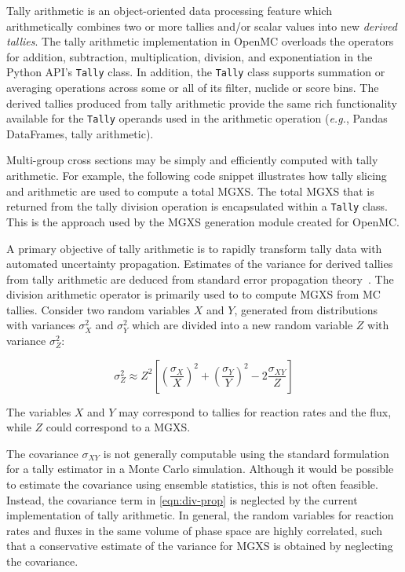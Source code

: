 Tally arithmetic is an object-oriented data processing feature which arithmetically combines two or more tallies and/or scalar values into new \textit{derived tallies}. The tally arithmetic implementation in OpenMC overloads the operators for addition, subtraction, multiplication, division, and exponentiation in the Python API's \texttt{Tally} class. In addition, the \texttt{Tally} class supports summation or averaging operations across some or all of its filter, nuclide or score bins. The derived tallies produced from tally arithmetic provide the same rich functionality available for the \texttt{Tally} operands used in the arithmetic operation (\textit{e.g.}, Pandas DataFrames, tally arithmetic).

Multi-group cross sections may be simply and efficiently computed with tally arithmetic. For example, the following code snippet illustrates how tally slicing and arithmetic are used to compute a total MGXS. The total MGXS that is returned from the tally division operation is encapsulated within a \texttt{Tally} class. This is the approach used by the MGXS generation module created for OpenMC.



A primary objective of tally arithmetic is to rapidly transform tally data with automated uncertainty propagation. Estimates of the variance for derived tallies from tally arithmetic are deduced from standard error propagation theory~\cite{bevington2003data}. The division arithmetic operator is primarily used to to compute MGXS from MC tallies. Consider two random variables $X$ and $Y$, generated from distributions with variances $\sigma_{X}^2$ and $\sigma_{Y}^2$ which are divided into a new random variable $Z$ with variance $\sigma_{Z}^2$:

\begin{equation}
\label{eqn:div-prop}
\sigma_{Z}^{2} \approx Z^{2}\left[\left(\frac{\sigma_{X}}{X}\right)^{2} + \left(\frac{\sigma_{Y}}{Y}\right)^{2} - 2\frac{\sigma_{XY}}{Z}\right]
\end{equation}

\noindent The variables $X$ and $Y$ may correspond to tallies for reaction rates and the flux, while $Z$ could correspond to a MGXS.

The covariance $\sigma_{XY}$ is not generally computable using the standard formulation for a tally estimator in a Monte Carlo simulation. Although it would be possible to estimate the covariance using ensemble statistics, this is not often feasible. Instead, the covariance term in \cref{eqn:div-prop} is neglected by the current implementation of tally arithmetic. In general, the random variables for reaction rates and fluxes in the same volume of phase space are highly correlated, such that a conservative estimate of the variance for MGXS is obtained by neglecting the covariance.

